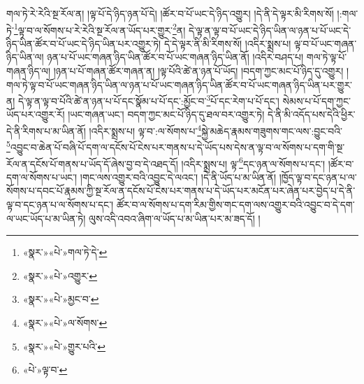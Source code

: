 གལ་ཏེ་རེ་རེའི་སྔ་རོལ་ན། །ལྟ་པོ་དེ་ཉིད་ཉན་པོ་དེ། །ཚོར་བ་པོ་ཡང་དེ་ཉིད་འགྱུར། །དེ་ནི་དེ་ལྟར་མི་རིགས་སོ། །:གལ་ཏེ་\footnote{«སྣར་»«པེ་»གལ་ཏེ་དེ་}ལྟ་བ་ལ་སོགས་པ་རེ་རེའི་སྔ་རོལ་ན་ཡོད་པར་གྱུར་\footnote{«སྣར་»«པེ་»འགྱུར་}ན། དེ་ལྟ་ན་ལྟ་བ་པོ་ཡང་དེ་ཉིད་ཡིན་ལ་ཉན་པ་པོ་ཡང་དེ་ཉིད་ཡིན་ཚོར་བ་པོ་ཡང་དེ་ཉིད་ཡིན་པར་འགྱུར་ཏེ། དེ་དེ་ལྟར་ནི་མི་རིགས་སོ། །འདིར་སྨྲས་པ། ལྟ་བ་པོ་ཡང་གཞན་ཉིད་ཡིན་ལ། ཉན་པ་པོ་ཡང་གཞན་ཉིད་ཡིན་ཚོར་བ་པོ་ཡང་གཞན་ཉིད་ཡིན་ནོ། །འདིར་བཤད་པ། གལ་ཏེ་ལྟ་པོ་གཞན་ཉིད་ལ། །ཉན་པ་པོ་གཞན་ཚོར་གཞན་ན། །ལྟ་པོའི་ཚེ་ན་ཉན་པོ་ཡོད། །བདག་ཀྱང་མང་པོ་ཉིད་དུ་འགྱུར། །གལ་ཏེ་ལྟ་བ་པོ་ཡང་གཞན་ཉིད་ཡིན་ལ་ཉན་པ་པོ་ཡང་གཞན་ཉིད་ཡིན་ཚོར་བ་པོ་ཡང་གཞན་ཉིད་ཡིན་པར་གྱུར་ན། དེ་ལྟ་ན་ལྟ་བ་པོའི་ཚེ་ན་ཉན་པ་པོ་དང་སྣོམ་པ་པོ་དང་:མྱོང་བ་\footnote{«སྣར་»«པེ་»མྱང་བ་}པོ་དང་རེག་པ་པོ་དང་། སེམས་པ་པོ་དག་ཀྱང་ཡོད་པར་འགྱུར་རོ། །ཡང་གཞན་ཡང་། བདག་ཀྱང་མང་པོ་ཉིད་དུ་ཐལ་བར་འགྱུར་ཏེ། དེ་ནི་མི་འདོད་པས་དེའི་ཕྱིར་དེ་ནི་རིགས་པ་མ་ཡིན་ནོ། །འདིར་སྨྲས་པ། ལྟ་བ་:ལ་སོགས་པ་\footnote{«སྣར་»«པེ་»ལ་སོགས་}སྐྱེ་མཆེད་རྣམས་གཟུགས་གང་ལས་:བྱུང་བའི་\footnote{«སྣར་»«པེ་»གྱུར་པའི་}འབྱུང་བ་ཆེན་པོ་བཞི་པོ་དག་ལ་དངོས་པོ་ངེས་པར་གནས་པ་དེ་ཡོད་པས་དེས་ན་ལྟ་བ་ལ་སོགས་པ་དག་གི་སྔ་རོལ་ན་དངོས་པོ་གནས་པ་ཡོད་དོ་ཞེས་བྱ་བ་དེ་འཐད་དོ། །འདིར་སྨྲས་པ། ལྟ་\footnote{«པེ་»ལྟ་བ་}དང་ཉན་ལ་སོགས་པ་དང་། །ཚོར་བ་དག་ལ་སོགས་པ་ཡང་། །གང་ལས་འགྱུར་བའི་འབྱུང་དེ་ལའང་། །དེ་ནི་ཡོད་པ་མ་ཡིན་ནོ། །ཁྱོད་ལྟ་བ་དང་ཉན་པ་ལ་སོགས་པ་དབང་པོ་རྣམས་ཀྱི་སྔ་རོལ་ན་དངོས་པོ་ངེས་པར་གནས་པ་དེ་ཡོད་པར་མངོན་པར་ཞེན་པར་བྱེད་པ་དེ་ནི་ལྟ་བ་དང་ཉན་པ་ལ་སོགས་པ་དང་། ཚོར་བ་ལ་སོགས་པ་དག་རིམ་གྱིས་གང་དག་ལས་འགྱུར་བའི་འབྱུང་བ་དེ་དག་ལ་ཡང་ཡོད་པ་མ་ཡིན་ཏེ། ལུས་འདི་འབའ་ཞིག་ལ་ཡོད་པ་མ་ཡིན་པར་མ་ཟད་དོ། །
